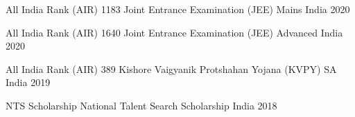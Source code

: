 



\begin{cvhonors}

  \cvhonor
    {All India Rank (AIR) 1183} %
    {Joint Entrance Examination (JEE) Mains} %
    {India} %
    {2020} %

  \cvhonor
    {All India Rank (AIR) 1640} %
    {Joint Entrance Examination (JEE) Advanced} %
    {India} %
    {2020} %

  \cvhonor
    {All India Rank (AIR) 389} %
    {Kishore Vaigyanik Protshahan Yojana (KVPY) SA} %
    {India} %
    {2019} %

  \cvhonor
    {NTS Scholarship} %
    {National Talent Search Scholarship} %
    {India} %
    {2018} %

\end{cvhonors}
